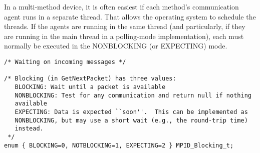 In a multi-method device, it is often easiest if each method's communication 
agent runs in a separate thread.  That allows the operating system to 
schedule the threads.  If the agents are running in the same thread (and 
particularly, if they are running in the main thread in a polling-mode 
implementation), each must normally be executed in the NONBLOCKING (or 
EXPECTING) mode.

\begin{verbatim}
/* Waiting on incoming messages */

/* Blocking (in GetNextPacket) has three values:
   BLOCKING: Wait until a packet is available
   NONBLOCKING: Test for any communication and return null if nothing 
   available
   EXPECTING: Data is expected ``soon''.  This can be implemented as 
   NONBLOCKING, but may use a short wait (e.g., the round-trip time) 
   instead. 
 */
enum { BLOCKING=0, NOTBLOCKING=1, EXPECTING=2 } MPID_Blocking_t;


\end{verbatim}
